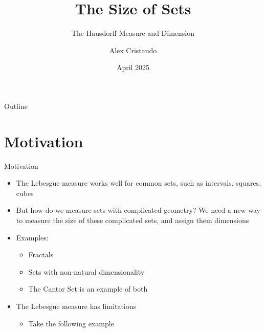 \documentclass{beamer}
\title[Hausdorff Measure and Dimension] %
{The Size of Sets}
\subtitle{The Hausdorff Measure and Dimension}
\author{Alex Cristaudo}
\date{April 2025}
\begin{document}
\frame{\titlepage}

\begin{frame}{Outline}
    \tableofcontents
\end{frame}


\section{Motivation}

\begin{frame}{Motivation}
    \begin{itemize}
        \item The Lebesgue measure works well for common sets, such as intervals, squares, cubes
        \item But how do we measure sets with complicated geometry? We need a new way to measure the size of these complicated sets, and assign them dimensions
        \item Examples:
            \begin{itemize}
                \item Fractals 
                \item Sets with non-natural dimensionality 
                \item The Cantor Set is an example of both
                
                
                
            \end{itemize}
        \item The Lebesgue measure has limitations
                \begin{itemize}
                    \item Take the following example
                \end{itemize}

    \end{itemize}
\end{frame}
\end{document}
